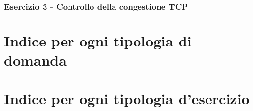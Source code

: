 \documentclass[a4paper]{article}
\begin{document}
	\subsubsection{Esercizio 3 - Controllo della congestione TCP}
	
	\newpage

	\section{Indice per ogni tipologia di domanda}

	\section{Indice per ogni tipologia d'esercizio}
\end{document}
